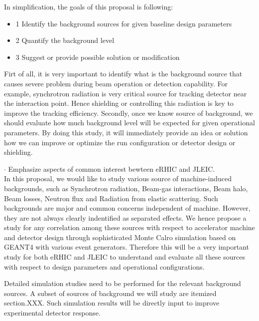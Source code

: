 In simplification, the goals of this proposal is following:
\begin{itemize}
\item{1} Identify the background sources for given baseline design parameters
\item{2} Quantify the background level
\item{3} Suggest or provide possible solution or modification
\end{itemize}

Firt of all, it is very important to identify what is the background source that causes severe problem during beam operation
or detection capability. For example, synchrotron radiation is very critical source for tracking detector near the interaction
point. Hence shielding or controlling this radiation is key to improve the tracking efficiency. Secondly, once we know source
of background, we should evaluate how much background level will be expected for given operational parameters. By doing this
study, it will immediately provide an idea or solution how we can improve or optimize the run configuration or detector design
or shielding.


$\cdot$ Emphasize aspects of common interest bewteen eRHIC and JLEIC. \\


In this proposal, we would like to study various source of machine-induced backgrounds, such as Synchrotron radiation,
 Beam-gas interactions, Beam halo, Beam losses, Neutron flux and Radiation from elastic scattering. Such backgrounds
 are major and common concerns independent of machine. However, they are not always clearly indentified as separated
 effects.  We hence propose a study for any correlation among these sources with respect to accelerator machine and
 detector design through sophisticated Monte Calro simulation based on GEANT4 with various event generators.
Therefore this will be a very important study for both eRHIC and JLEIC to understand and evaluate all these sources
with respect to design parameters and operational configurations.


Detailed simulation studies need to be performed for the relevant background sources.
A subset of sources of background we will study are itemized section.XXX.
Such simulation results will be directly input to improve experimental detector response.



